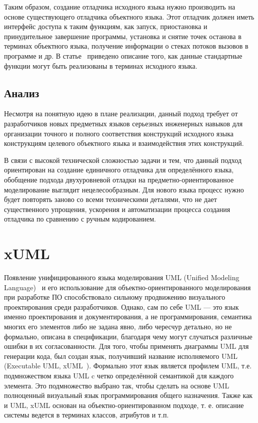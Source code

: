 \documentclass[a5paper]{article}
\begin{document}
Таким образом, создание отладчика исходного языка нужно производить на основе существующего отладчика объектного языка. Этот отладчик должен иметь интерфейс доступа к таким функциям, как запуск, приостановка и принудительное завершение программы, установка и снятие точек останова в терминах объектного языка, получение информации о стеках потоков вызовов в программе и др. В статье~\cite{kartashev} приведено описание того, как данные стандартные функции могут быть реализованы в терминах исходного языка.

\subsection{Анализ}

Несмотря на понятную идею в плане реализации, данный подход требует от разработчиков новых предметных языков серьезных инженерных навыков для организации точного и полного соответствия конструкций исходного языка конструкциям целевого объектного языка и взаимодействия этих конструкций. 

В связи с высокой технической сложностью задачи и тем, что данный подход ориентирован на создание единичного отладчика для определённого языка, обобщение подхода двухуровневой отладки на предметно-ориентированное моделирование выглядит нецелесообразным. Для нового языка процесс нужно будет повторять заново со всеми техническими деталями, что не дает существенного упрощения, ускорения и автоматизации процесса создания отладчика по сравнению с ручным кодированием.

\section{xUML}

Появление унифицированного языка моделирования UML (Unified Modeling Language)~\cite{uml} и его использование для объектно-ориентированного моделирования при разработке ПО способствовало сильному продвижению визуального проектирования среди разработчиков. Однако, сам по себе UML --- это язык именно проектирования и документирования, а не программирования, семантика многих его элементов либо не задана явно, либо чересчур детально, но не формально, описана в спецификации, благодаря чему могут случаться различные ошибки в их согласованности. Для того, чтобы применять диаграммы UML для генерации кода, был создан язык, получивший название исполняемого UML (Executable UML, xUML~\cite{xuml1, xuml2, xuml3}). Формально этот язык является профилем UML, т.е. подмножеством языка UML c четко определённой семантикой для каждого элемента. Это подмножество выбрано так, чтобы сделать на основе UML полноценный визуальный язык программирования общего назначения. Также как и UML, xUML основан на объектно-ориентированном подходе,
 т.
е. описание системы ведется в терминах классов, атрибутов и т.п.
\end{document}
